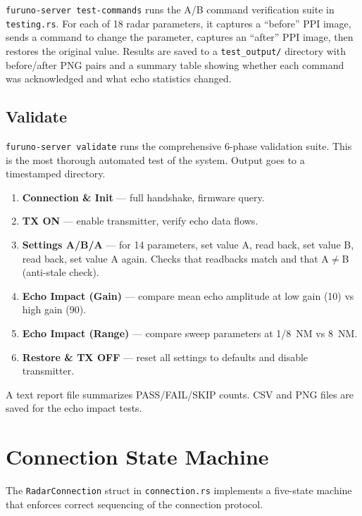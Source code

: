 \documentclass[11pt,letterpaper]{article}
\begin{document}
\texttt{furuno-server test-commands} runs the A/B command verification suite in \texttt{testing.rs}. For each of 18 radar parameters, it captures a ``before'' PPI image, sends a command to change the parameter, captures an ``after'' PPI image, then restores the original value. Results are saved to a \texttt{test\_output/} directory with before/after PNG pairs and a summary table showing whether each command was acknowledged and what echo statistics changed.

\subsection{Validate}
\label{subsec:cli-validate}

\texttt{furuno-server validate} runs the comprehensive 6-phase validation suite. This is the most thorough automated test of the system. Output goes to a timestamped directory.

\begin{enumerate}[leftmargin=2em]
\item \textbf{Connection \& Init} --- full handshake, firmware query.
\item \textbf{TX ON} --- enable transmitter, verify echo data flows.
\item \textbf{Settings A/B/A} --- for 14 parameters, set value A, read back, set value B, read back, set value A again. Checks that readbacks match and that A$\ne$B (anti-stale check).
\item \textbf{Echo Impact (Gain)} --- compare mean echo amplitude at low gain (10) vs high gain (90).
\item \textbf{Echo Impact (Range)} --- compare sweep parameters at 1/8~NM vs 8~NM.
\item \textbf{Restore \& TX OFF} --- reset all settings to defaults and disable transmitter.
\end{enumerate}

A text report file summarizes PASS/FAIL/SKIP counts. CSV and PNG files are saved for the echo impact tests.


\newpage
\section{Connection State Machine}
\label{sec:connection-state-machine}

The \texttt{RadarConnection} struct in \texttt{connection.rs} implements a five-state machine that enforces correct sequencing of the connection protocol.
\end{document}
